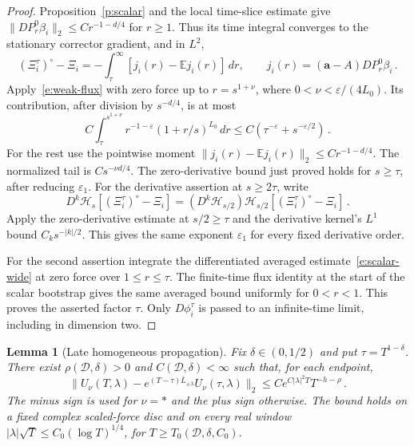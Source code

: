 \documentclass[11pt]{amsart}
\newtheorem{lemma}[proposition]{Lemma}
\theoremstyle{definition}
\theoremstyle{remark}
\numberwithin{equation}{section}
\newcommand{\E}{\mathbb E}
\renewcommand{\a}{\mathbf a}
\begin{document}
\begin{proof}
Proposition~\ref{p:scalar} and the local time-slice estimate give $\|DP_r^0\beta_i\|_2\leq Cr^{-1-d/4}$ for $r\geq1$. Thus its time integral converges to the stationary corrector gradient, and in $L^2$,
\begin{equation*}
 (\Xi_i^\tau)^\circ-\Xi_i
 =-\int_\tau^\infty[j_i(r)-\E j_i(r)]\,dr,
 \qquad j_i(r)=(\a-A)DP_r^0\beta_i\, .
\end{equation*}
Apply~\eqref{e:weak-flux} with zero force up to $r=s^{1+\nu}$, where $0<\nu<\varepsilon/(4L_0)$. Its contribution, after division by $s^{-d/4}$, is at most
\begin{equation*}
 C\int_\tau^{s^{1+\nu}}r^{-1-\varepsilon}(1+r/s)^{L_0}\,dr
 \leq C(\tau^{-\varepsilon}+s^{-\varepsilon/2})\, .
\end{equation*}
For the rest use the pointwise moment $\|j_i(r)-\E j_i(r)\|_2\leq Cr^{-1-d/4}$. The normalized tail is $Cs^{-\nu d/4}$. The zero-derivative bound just proved holds for $s\geq\tau$, after reducing $\varepsilon_1$. For the derivative assertion at $s\geq2\tau$, write
\begin{equation*}
 D^k\mathcal H_s[(\Xi_i^\tau)^\circ-\Xi_i]
 =(D^k\mathcal H_{s/2})\mathcal H_{s/2}[(\Xi_i^\tau)^\circ-\Xi_i] \, .
\end{equation*}
Apply the zero-derivative estimate at $s/2\geq\tau$ and the derivative kernel's $L^1$ bound $C_k s^{-|k|/2}$. This gives the same exponent $\varepsilon_1$ for every fixed derivative order.

For the second assertion integrate the differentiated averaged estimate~\eqref{e:scalar-wide} at zero force over $1\leq r\leq\tau$. The finite-time flux identity at the start of the scalar bootstrap gives the same averaged bound uniformly for $0<r<1$. This proves the asserted factor $\tau$. Only $D\phi_i^\tau$ is passed to an infinite-time limit, including in dimension two.
\end{proof}

\begin{lemma}[Late homogeneous propagation]\label{l:late-propagation}
Fix $\delta\in(0,1/2)$ and put $\tau=T^{1-\delta}$. There exist $\rho(\mathcal D,\delta)>0$ and $C(\mathcal D,\delta)<\infty$ such that, for each endpoint,
\begin{equation}\label{e:late-propagation}
 \|U_\nu(T,\lambda)
      -e^{(T-\tau)\overline L_{\pm\lambda}}U_\nu(\tau,\lambda)\|_2
 \leq Ce^{C|\lambda|^2T}T^{-h-\rho}\, .
\end{equation}
The minus sign is used for $\nu=*$ and the plus sign otherwise. The bound holds on a fixed complex scaled-force disc and on every real window $|\lambda|\sqrt T\leq C_0(\log T)^{1/4}$, for $T\geq T_0(\mathcal D,\delta,C_0)$.
\end{lemma}
\end{document}

